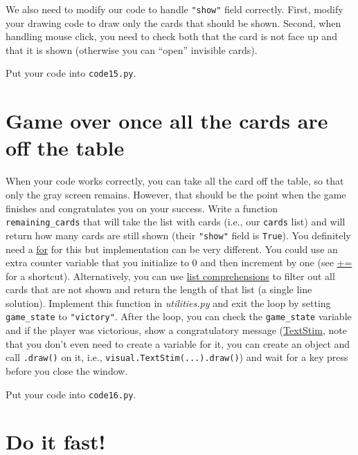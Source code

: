 \documentclass[
]{book}
\begin{document}
We also need to modify our code to handle \texttt{"show"} field correctly. First, modify your drawing code to draw only the cards that should be shown. Second, when handling mouse click, you need to check both that the card is not face up and that it is shown (otherwise you can ``open'' invisible cards).

Put your code into \texttt{code15.py}.

\hypertarget{game-over-once-all-the-cards-are-off-the-table}{%
\section{Game over once all the cards are off the table}\label{game-over-once-all-the-cards-are-off-the-table}}

When your code works correctly, you can take all the card off the table, so that only the gray screen remains. However, that should be the point when the game finishes and congratulates you on your success. Write a function \texttt{remaining\_cards} that will take the list with cards (i.e., our \texttt{cards} list) and will return how many cards are still shown (their \texttt{"show"} field is \texttt{True}). You definitely need a \protect\hyperlink{for-loop}{for} for this but implementation can be very different. You could use an extra counter variable that you initialize to 0 and then increment by one (see \href{https://docs.python.org/3/reference/simple_stmts.html\#augmented-assignment-statements}{+=} for a shortcut). Alternatively, you can use \href{l\#list-comprehension}{list comprehensions} to filter out all cards that are not shown and return the length of that list (a single line solution). Implement this function in \emph{utilities.py} and exit the loop by setting \texttt{game\_state} to \texttt{"victory"}. After the loop, you can check the \texttt{game\_state} variable and if the player was victorious, show a congratulatory message (\href{https://psychopy.org/api/visual/textstim.html\#psychopy.visual.TextStim}{TextStim}, note that you don't even need to create a variable for it, you can create an object and call \texttt{.draw()} on it, i.e., \texttt{visual.TextStim(...).draw()}) and wait for a key press before you close the window.

Put your code into \texttt{code16.py}.

\hypertarget{do-it-fast}{%
\section{Do it fast!}\label{do-it-fast}}
\end{document}
